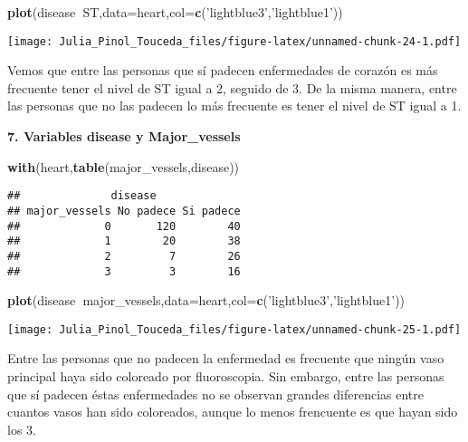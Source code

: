 \documentclass[]{article}
\newenvironment{Shaded}{\begin{snugshade}}{\end{snugshade}}
\newcommand{\KeywordTok}[1]{\textcolor[rgb]{0.13,0.29,0.53}{\textbf{#1}}}
\newcommand{\DataTypeTok}[1]{\textcolor[rgb]{0.13,0.29,0.53}{#1}}
\newcommand{\StringTok}[1]{\textcolor[rgb]{0.31,0.60,0.02}{#1}}
\newcommand{\OperatorTok}[1]{\textcolor[rgb]{0.81,0.36,0.00}{\textbf{#1}}}
\newcommand{\NormalTok}[1]{#1}
\begin{document}
\begin{Shaded}
\begin{Highlighting}[]
\KeywordTok{plot}\NormalTok{(disease}\OperatorTok{~}\NormalTok{ST,}\DataTypeTok{data=}\NormalTok{heart,}\DataTypeTok{col=}\KeywordTok{c}\NormalTok{(}\StringTok{'lightblue3'}\NormalTok{,}\StringTok{'lightblue1'}\NormalTok{))}
\end{Highlighting}
\end{Shaded}

\texttt{[image: Julia\_Pinol\_Touceda\_files/figure-latex/unnamed-chunk-24-1.pdf]}

Vemos que entre las personas que sí padecen enfermedades de corazón es
más frecuente tener el nivel de ST igual a 2, seguido de 3. De la misma
manera, entre las personas que no las padecen lo más frecuente es tener
el nivel de ST igual a 1.

\textbf{7. Variables disease y Major\_vessels}

\begin{Shaded}
\begin{Highlighting}[]
\KeywordTok{with}\NormalTok{(heart,}\KeywordTok{table}\NormalTok{(major_vessels,disease)) }
\end{Highlighting}
\end{Shaded}

\begin{verbatim}
##              disease
## major_vessels No padece Si padece
##             0       120        40
##             1        20        38
##             2         7        26
##             3         3        16
\end{verbatim}

\begin{Shaded}
\begin{Highlighting}[]
\KeywordTok{plot}\NormalTok{(disease}\OperatorTok{~}\NormalTok{major_vessels,}\DataTypeTok{data=}\NormalTok{heart,}\DataTypeTok{col=}\KeywordTok{c}\NormalTok{(}\StringTok{'lightblue3'}\NormalTok{,}\StringTok{'lightblue1'}\NormalTok{))}
\end{Highlighting}
\end{Shaded}

\texttt{[image: Julia\_Pinol\_Touceda\_files/figure-latex/unnamed-chunk-25-1.pdf]}

Entre las personas que no padecen la enfermedad es frecuente que ningún
vaso principal haya sido coloreado por fluoroscopia. Sin embargo, entre
las personas que sí padecen éstas enfermedades no se observan grandes
diferencias entre cuantos vasos han sido coloreados, aunque lo menos
frencuente es que hayan sido los 3.
\end{document}

